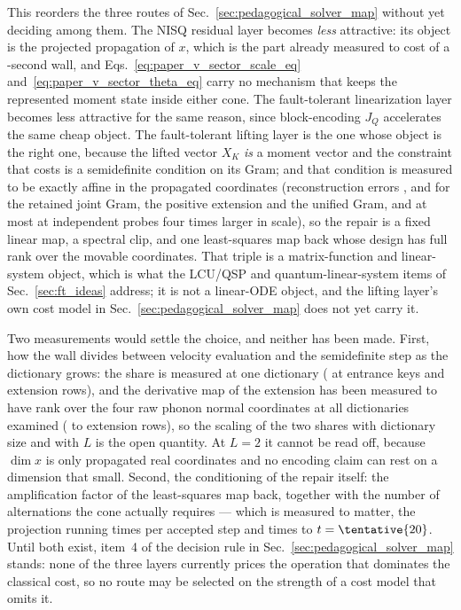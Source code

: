 This reorders the three routes of Sec.~\ref{sec:pedagogical_solver_map}
without yet deciding among them.  The NISQ residual layer becomes \emph{less}
attractive: its object is the projected propagation of \(x\), which is the
part already measured to cost  of a
-second wall, and
Eqs.~\eqref{eq:paper_v_sector_scale_eq}
and~\eqref{eq:paper_v_sector_theta_eq} carry no mechanism that keeps the
represented moment state inside either cone.  The fault-tolerant linearization
layer becomes less attractive for the same reason, since block-encoding
\(J_Q\) accelerates the same cheap object.  The fault-tolerant lifting layer
is the one whose object is the right one, because the lifted vector \(X_K\)
\emph{is} a moment vector and the constraint that costs is a semidefinite
condition on its Gram; and that condition is measured to be exactly affine in
the propagated coordinates (reconstruction errors
,  and
 for the retained joint Gram, the positive
extension and the unified Gram, and at most 
at independent probes four times larger in scale), so the repair is a fixed
linear map, a spectral clip, and one least-squares map back whose design has
full rank  over the  movable
coordinates.  That triple is a matrix-function and linear-system object, which
is what the LCU/QSP and quantum-linear-system items of
Sec.~\ref{sec:ft_ideas} address; it is not a linear-ODE object, and the
lifting layer's own cost model in Sec.~\ref{sec:pedagogical_solver_map} does
not yet carry it.

Two measurements would settle the choice, and neither has been made.  First,
how the wall divides between velocity evaluation and the semidefinite step as
the dictionary grows: the share is measured at one dictionary
( at  entrance keys and
 extension rows), and the derivative map of the extension
has been measured to have rank  over the four raw phonon
normal coordinates at all  dictionaries examined
( to  extension rows), so the scaling of
the two shares with dictionary size and with \(L\) is the open quantity.  At
\(L=2\) it cannot be read off, because \(\dim x\) is only
 propagated real coordinates and no encoding claim can rest
on a dimension that small.  Second, the conditioning of the repair itself: the
amplification factor of the least-squares map back, together with the number
of alternations the cone actually requires --- which is measured to matter,
the projection running  times per accepted step and
 times to \(t=\tentative{20}\).  Until both exist,
item~4 of the decision rule in Sec.~\ref{sec:pedagogical_solver_map} stands:
none of the three layers currently prices the operation that dominates the
classical cost, so no route may be selected on the strength of a cost model
that omits it.
